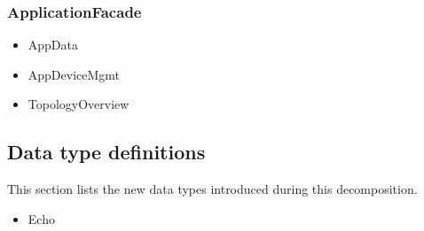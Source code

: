    \subsubsection{ApplicationFacade}
        \begin{itemize}
            \item AppData
            \item AppDeviceMgmt
            \item TopologyOverview
        \end{itemize}


\subsection{Data type definitions}
    This section lists the new data types introduced during this decomposition.

    \begin{itemize}
        \item Echo
    \end{itemize}
